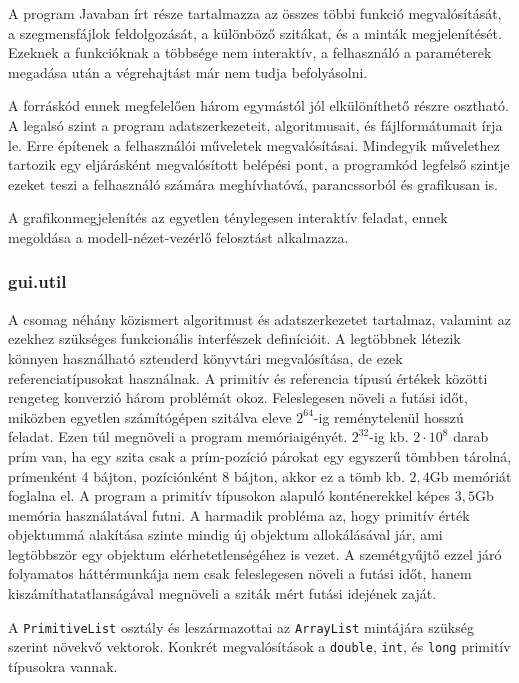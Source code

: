 A program Javaban írt része tartalmazza az összes többi funkció megvalósítását, a szegmensfájlok feldolgozását, a különböző szitákat, és a minták megjelenítését.
Ezeknek a funkcióknak a többsége nem interaktív, a felhasználó a paraméterek megadása után a végrehajtást már nem tudja befolyásolni.

A forráskód ennek megfelelően három egymástól jól elkülöníthető részre osztható.
A legalsó szint a program adatszerkezeteit, algoritmusait, és fájlformátumait írja le. 
Erre építenek a felhasználói műveletek megvalósításai.
Mindegyik művelethez tartozik egy eljárásként megvalósított belépési pont, a programkód legfelső szintje ezeket teszi a felhasználó számára meghívhatóvá, parancssorból és grafikusan is.

A grafikonmegjelenítés az egyetlen ténylegesen interaktív feladat, ennek megoldása a modell-nézet-vezérlő felosztást alkalmazza.

\subsubsection{gui.util}

A csomag néhány közismert algoritmust és adatszerkezetet tartalmaz, valamint az ezekhez szükséges funkcionális interfészek definícióit.
A legtöbbnek létezik könnyen használható sztenderd könyvtári megvalósítása, de ezek referenciatípusokat használnak.
A primitív és referencia típusú értékek közötti rengeteg konverzió három problémát okoz.
Feleslegesen növeli a futási időt, miközben egyetlen számítógépen szitálva eleve $2^{64}$-ig reménytelenül hosszú feladat.
Ezen túl megnöveli a program memóriaigényét.
$2^{32}$-ig kb. $2\cdot10^8$ darab prím van, ha egy szita csak a prím-pozíció párokat egy egyszerű tömbben tárolná, prímenként 4 bájton, pozíciónként 8 bájton, akkor ez a tömb kb. $2,4$Gb memóriát foglalna el.
A program a primitív típusokon alapuló konténerekkel képes $3,5$Gb memória használatával futni.
A harmadik probléma az, hogy primitív érték objektummá alakítása szinte mindig új objektum allokálásával jár, ami legtöbbször egy objektum elérhetetlenségéhez is vezet.
A szemétgyűjtő ezzel járó folyamatos háttérmunkája nem csak feleslegesen növeli a futási időt, hanem kiszámíthatatlanságával megnöveli a sziták mért futási idejének zaját.

A \texttt{PrimitiveList} osztály és leszármazottai az \texttt{ArrayList} mintájára szükség szerint növekvő vektorok. Konkrét megvalósítások a \texttt{double}, \texttt{int}, és \texttt{long} primitív típusokra vannak.

